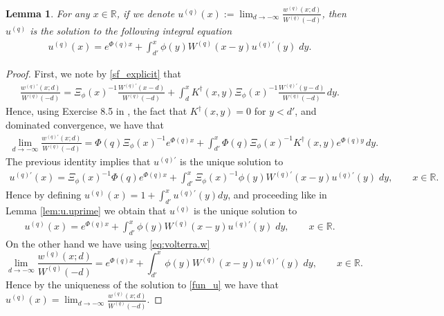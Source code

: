 \documentclass[12pt,reqno]{amsart}
\newcommand{\blue}{\textcolor[rgb]{0.00,0.00,1.00}}
\newcommand{\green}{\textcolor[rgb]{0.00,0.70,.30}}
\newtheorem{lemma}[theorem]{Lemma}
\theoremstyle{definition}
\theoremstyle{remark}
\begin{document}
\begin{lemma}\label{fun_u,v}
	For any $x\in\mathbb{R}$, if we denote $u^{(q)}(x):=\lim_{d\to-\infty}\frac{w^{(q)}(x;d)}{W^{(q)}(-d)}$, then $u^{(q)}$ is the solution to the following integral equation
	\begin{align}
	\label{fun_u}
	u^{(q)}(x)=e^{\Phi(q)x}+\int_{d'}^x  \phi(y) W^{(q)}(x-y)u^{(q)\prime}(y)\;dy.
	\end{align} 
\end{lemma}
\begin{proof} 
	First, we note by \eqref{sf_explicit} that
	\begin{align*}
	\frac{w^{(q)\prime}(x;d)}{W^{(q)}(-d)}=\Xi_{\phi}(x)^{-1} \frac{W^{(q)\prime}(x-d)}{W^{(q)}(-d)}+\int_d^x K^{\dagger}(x,y) \Xi_{\phi}(x)^{-1}\frac{W^{(q)\prime}(y-d)}{W^{(q)}(-d)}\,dy.
	\end{align*}
	Hence, using Exercise 8.5 in \cite{kyprianou2014}, the fact that $K^{\dagger}(x,y)=0$ for $y<d'$, and dominated convergence, we have that
	\begin{align*}
	\lim_{d\to-\infty}\frac{w^{(q)\prime}(x;d)}{W^{(q)}(-d)}=\Phi(q)\Xi_{\phi}(x)^{-1} 
	e^{\Phi(q)x}+\int_{d'}^x \Phi(q) \Xi_{\phi}(x)^{-1} K^{\dagger}(x,y)e^{\Phi(q)y}\,dy.
	\end{align*}
The previous identity implies that $u^{(q)\prime}$ is the unique solution to
\begin{align*}
u^{(q)\prime}(x)=\Xi_{\phi}(x)^{-1} \Phi(q)e^{\Phi(q)x}+\int_{d'}^x \Xi_{\phi}(x)^{-1} \phi(y) W^{(q)\prime}(x-y)u^{(q)\prime}(y)\;dy,\qquad\text{$x\in\mathbb{R}$.}
\end{align*}
Hence by defining $u^{(q)}(x)=1+\int_{d'}^xu^{(q)\prime}(y)dy$, and proceeding like in Lemma \ref{lem:u.uprime} we obtain that $u^{(q)}$ is the unique solution to
\begin{align*}
u^{(q)}(x)=e^{\Phi(q)x}+\int_{d'}^x  \phi(y) W^{(q)}(x-y)u^{(q)\prime}(y)\;dy,\qquad\text{$x\in\mathbb{R}$.}
\end{align*}
On the other hand we have using \eqref{eq:volterra.w}
\begin{equation*}
\lim_{d\to-\infty}\frac{w^{(q)}(x;d)}{W^{(q)}(-d)}=e^{\Phi(q)x}+\int_{d'}^x  \phi(y) W^{(q)}(x-y)u^{(q)\prime}(y)\;dy,\qquad\text{$x\in\mathbb{R}$.}
\end{equation*}
Hence by the uniqueness of the solution to \eqref{fun_u} we have that $u^{(q)}(x)=\lim_{d\to-\infty}\frac{w^{(q)}(x;d)}{W^{(q)}(-d)}$.
\end{proof}
	
\end{document}

